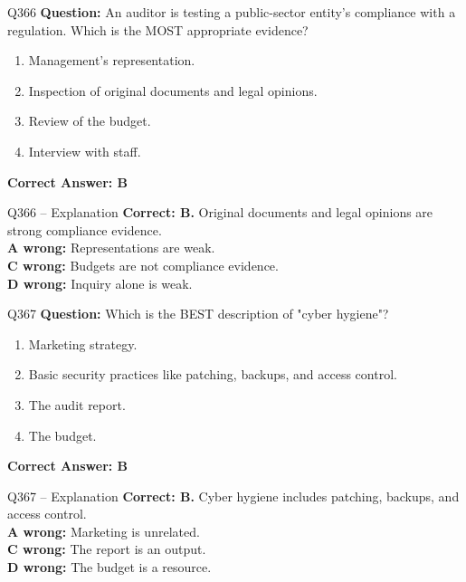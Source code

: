 \documentclass[aspectratio=169,10pt]{beamer}
\begin{document}
	\begin{frame}[t]{Q366}
		\small
		\textbf{Question:} An auditor is testing a public-sector entity's compliance with a regulation. Which is the MOST appropriate evidence?
		\begin{enumerate}[label=\Alph*.,itemsep=1pt,topsep=2pt]
			\item Management's representation.
			\item Inspection of original documents and legal opinions.
			\item Review of the budget.
			\item Interview with staff.
		\end{enumerate}
		\vspace{4pt}
		\textbf{Correct Answer: B}
	\end{frame}
	
	\begin{frame}[t]{Q366 -- Explanation}
		\small
		\textbf{Correct: B.} Original documents and legal opinions are strong compliance evidence. \\[4pt]
		\textbf{A wrong:} Representations are weak. \\[2pt]
		\textbf{C wrong:} Budgets are not compliance evidence. \\[2pt]
		\textbf{D wrong:} Inquiry alone is weak.
	\end{frame}
	
	\begin{frame}[t]{Q367}
		\small
		\textbf{Question:} Which is the BEST description of "cyber hygiene"?
		\begin{enumerate}[label=\Alph*.,itemsep=1pt,topsep=2pt]
			\item Marketing strategy.
			\item Basic security practices like patching, backups, and access control.
			\item The audit report.
			\item The budget.
		\end{enumerate}
		\vspace{4pt}
		\textbf{Correct Answer: B}
	\end{frame}
	
	\begin{frame}[t]{Q367 -- Explanation}
		\small
		\textbf{Correct: B.} Cyber hygiene includes patching, backups, and access control. \\[4pt]
		\textbf{A wrong:} Marketing is unrelated. \\[2pt]
		\textbf{C wrong:} The report is an output. \\[2pt]
		\textbf{D wrong:} The budget is a resource.
	\end{frame}
	
\end{document}
